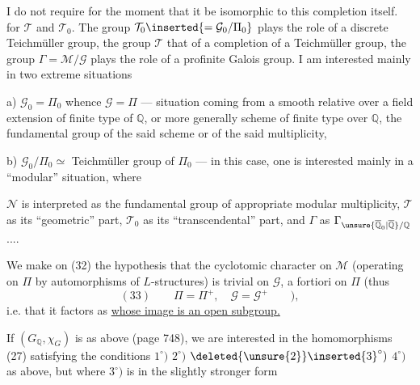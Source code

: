 
I do not require for the moment that it be isomorphic to this completion itself.   for $\mathcal{T}$ and $\mathcal{T}_0$. The group $\mathcal{T}_0\inserted{=\mathcal{G}_0/\Pi_0}$ plays the role of a discrete  Teichmüller group, the group $\mathcal{T}$ that of a completion of a Teichmüller group, the group $\Gamma=\mathcal{M}/\mathcal{G}$ plays the role of a profinite Galois group.  I am interested mainly in two extreme situations

a) $\mathcal{G}_0=\Pi_0$ whence $\mathcal{G}=\Pi$ --- situation coming from a smooth relative  over a field  extension of finite type of $\mathbb{Q}$, or more generally  scheme   of finite type over $\mathbb{Q}$,   the fundamental group of the said  scheme or of the said multiplicity,

b) $\mathcal{G}_0/\Pi_0\simeq$ Teichmüller group of $\Pi_0$  --- in this case, one is interested mainly in a ``modular'' situation, where


$\mathcal{N}$ is interpreted as the fundamental group of  appropriate modular multiplicity, $\mathcal{T}$ as its ``geometric'' part, $\mathcal{T}_0$ as its ``transcendental'' part, and $\Gamma$ as $\Gamma_{\unsure{\overline{\mathbb{Q}}_0|\overline{\mathbb{Q}}}/\mathbb{Q}}$ ....

We make on (32) the hypothesis that the cyclotomic character on $\mathcal{M}$ (operating on $\Pi$ by automorphisms of $L$-structures) is trivial on $\mathcal{G}$, a fortiori on $\Pi$ (thus
\[
(33)\qquad \Pi=\Pi^{+},\quad \mathcal{G}=\mathcal{G}^{+}\qquad ),
\]
i.e. that it factors as
\uline{whose image is an open subgroup.}

If $(G_{\mathbb{Q}},\chi_G)$ is as above (page 748), we are interested in the homomorphisms (27)
satisfying the conditions $1^{\circ})$ $2^{\circ})$ $\deleted{\unsure{2}}\inserted{3}^{\circ})$ $4^{\circ})$ as above, but where $3^{\circ})$ is  in the slightly stronger form

